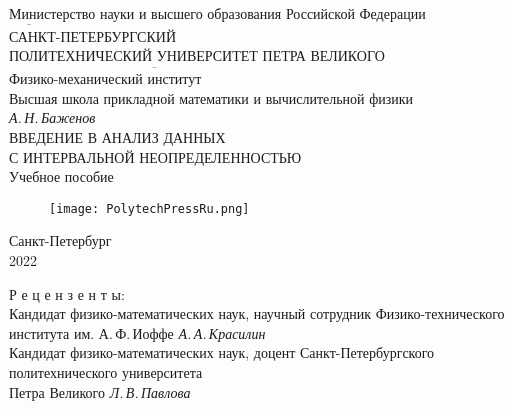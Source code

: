\documentclass[a5paper,openany]{book}
\newcommand{\ov}{\overline}
\begin{document}
{\thispagestyle{empty}
\newpage
{\small
\begin{center}
	\hfill \break
	Министерство науки и высшего образования  Российской Федерации\\
$\ov{~~~~~~~~~~~~~}$\\
	\normalsize{	САНКТ-ПЕТЕРБУРГСКИЙ \\
		ПОЛИТЕХНИЧЕСКИЙ УНИВЕРСИТЕТ ПЕТРА ВЕЛИКОГО}\\ 
	$\ov{~~~~~~~~~~~~~~~~~~~~~~~~~~~~~~~~~~~~~~~~~~~~~~~~~~~~~~~~~~~~~~~~~~~~~~~~~~~~~~~~~~~~~~~~~~~~~~}$\\	
	{\small Физико-механический институт\\
	Высшая школа прикладной математики и вычислительной физики}\\
	\hfill \break
	\Large{\it А.\,Н.\,Баженов\\
		\hfill \break		\hfill \break		}
	{\Large	ВВЕДЕНИЕ В АНАЛИЗ ДАННЫХ\\
		С ИНТЕРВАЛЬНОЙ НЕОПРЕДЕЛЕННОСТЬЮ}\\
	\hfill \break 	\hfill \break	
	\Large{	Учебное пособие	
	}\\
\end{center}

\hfill \break		\hfill \break	
\begin{figure}[h]
	\centering
	\texttt{[image: PolytechPressRu.png]}
\end{figure}
\begin{center}\Large{Санкт-Петербург \\
		2022} \end{center}
\thispagestyle{empty} %
}
\newpage
{\small







\begin{center}
	Р е ц е н з е н т ы:\\
	
	Кандидат физико-математических наук, научный сотрудник Физико-технического института им. А.\,Ф.\,Иоффе
	{\it А.\,А.\,Красилин}\\
	Кандидат физико-математических наук, доцент Санкт-Петербургского политехнического  университета \\ Петра Великого {\it Л.\,В.\,Павлова}
\end{center}

}}
\end{document}

